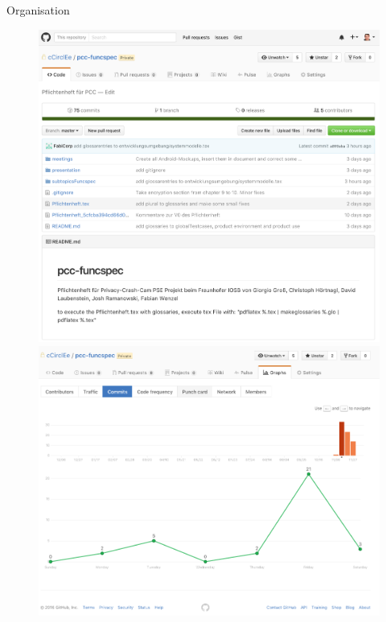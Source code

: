 \documentclass[19pt]{beamer}
\begin{document}
\begin{frame}[allowframebreaks]{Organisation}
\begin{figure}
\begin{center}
			\includegraphics[scale=0.20]{logos/Github} 
		\end{center}
		\framebreak
		\begin{center}
			\includegraphics[scale=0.23]{logos/GithubStats} 
		\end{center}
	\end{figure}				
\end{frame}
\end{document}
